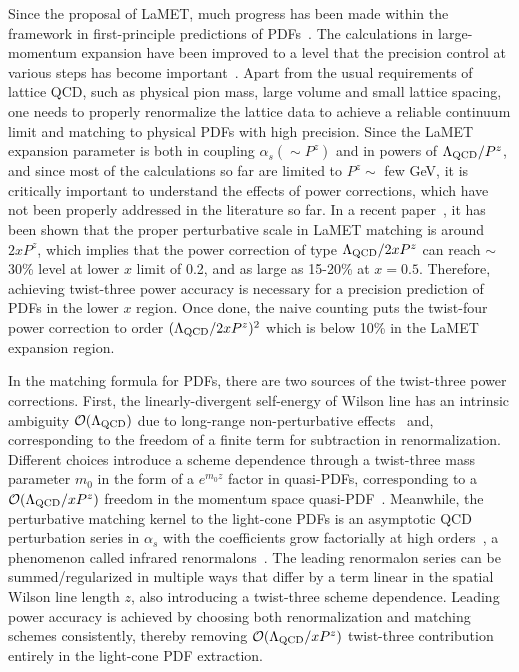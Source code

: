 \documentclass[prd,aps,nofootinbib,superscriptaddress,floatfix,preprintnumbers,twocolumn]{revtex4}
\begin{document}
Since the proposal of LaMET, much progress has been made within the framework in first-principle predictions of PDFs~\cite{Constantinou:2020hdm,Ji:2020ect,Constantinou:2022yye}. The calculations in large-momentum expansion have been improved to a level that the precision control at various steps has become important~\cite{Gao:2021dbh}. Apart from the usual requirements of lattice QCD, such as physical pion mass, large volume and small lattice spacing, one needs to properly renormalize the lattice data to achieve a reliable continuum limit and matching to physical PDFs with high precision. Since the LaMET expansion parameter is both in coupling $\alpha_s(\sim P^z)$ and in powers of $\Lambda_{\rm QCD}/P^z$, and since most of the calculations so far are limited to $P^z\sim $ few GeV, it is critically important to understand the effects of power corrections, which have not been properly addressed in the literature so far. In a recent paper~\cite{Su:2022fiu}, it has been shown that the proper perturbative scale in LaMET matching is around $2xP^z$, which implies that the power correction of type $\Lambda_{\rm QCD}/2xP^z$ can reach $\sim$ 30\% level at lower $x$ limit of 0.2, and as large as 15-20\% at $x=0.5$. Therefore, achieving twist-three power accuracy is necessary for a precision prediction of PDFs in the lower $x$ region. Once done, the naive counting puts the twist-four power correction to order $(\Lambda_{\rm QCD}/2xP^z)^2$ which is below 10\% in the LaMET expansion region. 

In the matching formula for PDFs, there are two sources of the twist-three power corrections. First, the linearly-divergent self-energy of Wilson line has an intrinsic ambiguity $\mathcal{O}(\Lambda_{\rm QCD})$ due to long-range non-perturbative effects~\cite{Beneke:1992ea,Beneke:1992ch,Beneke:1998ui,Bauer:2011ws,Bali:2013pla,Bali:2014fea,Bali:2014sja,Ayala:2019uaw,Ayala:2020pxq} and, corresponding to the freedom of a finite term for subtraction in renormalization. Different choices introduce a scheme dependence through a twist-three mass parameter $m_0$ in the form of a $e^{m_0z}$ factor in quasi-PDFs, corresponding to a $\mathcal{O}(\Lambda_{\rm QCD}/xP^z)$ freedom in the momentum space quasi-PDF~\cite{Ji:2020brr}. Meanwhile, the perturbative matching kernel to the light-cone PDFs is an asymptotic QCD perturbation series in $\alpha_s$ with the coefficients grow factorially at high orders~\cite{Braun:2018brg}, a phenomenon called infrared renormalons~\cite{tHooft:1977}. The leading renormalon series can be summed/regularized in multiple ways that differ by a term linear in the spatial Wilson line length $z$, also introducing a twist-three scheme dependence. Leading power accuracy is achieved by choosing both renormalization and matching schemes consistently, thereby removing $\mathcal{O}(\Lambda_{\rm QCD}/xP^z)$ twist-three contribution entirely in the light-cone PDF extraction.
\end{document}
